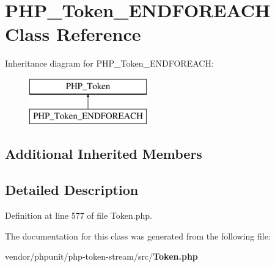 \section{P\+H\+P\+\_\+\+Token\+\_\+\+E\+N\+D\+F\+O\+R\+E\+A\+C\+H Class Reference}
\label{class_p_h_p___token___e_n_d_f_o_r_e_a_c_h}
Inheritance diagram for P\+H\+P\+\_\+\+Token\+\_\+\+E\+N\+D\+F\+O\+R\+E\+A\+C\+H\+:\begin{figure}[H]
\begin{center}
\leavevmode
\includegraphics[height=2.000000cm]{class_p_h_p___token___e_n_d_f_o_r_e_a_c_h}
\end{center}
\end{figure}
\subsection*{Additional Inherited Members}


\subsection{Detailed Description}


Definition at line 577 of file Token.\+php.



The documentation for this class was generated from the following file\+:\begin{DoxyCompactItemize}
\item 
vendor/phpunit/php-\/token-\/stream/src/{\bf Token.\+php}\end{DoxyCompactItemize}
